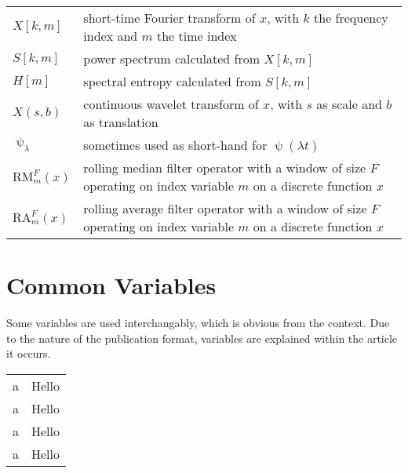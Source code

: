 \begin{tabular}{p{} p{}}
    $X[k,m]$ & short-time Fourier transform of $x$, with $k$ the frequency index and $m$ the time index \\
    $S[k,m]$ & power spectrum calculated from $X[k, m]$ \\
    $H[m]$ & spectral entropy calculated from $S[k, m]$ \\
    $X(s, b)$ & continuous wavelet transform of $x$, with $s$ as scale and $b$ as translation \\
    $\uppsi_\lambda$ & sometimes used as short-hand for  $\uppsi(\lambda t)$\\
    $\text{RM}^F_m (x)$ & rolling median filter operator with a window of size $F$ operating on index variable $m$ on a discrete function $x$\\
    $\text{RA}^F_m (x)$ & rolling average filter operator with a window of size $F$ operating on index variable $m$ on a discrete function $x$\\
\end{tabular}

\clearpage
\section*{Common Variables}
Some variables are used interchangably, which is obvious from the context. Due to the nature of the publication format, variables are explained within the article it occurs.

\begin{tabular}{p{} p{}}
    a & Hello \\
    a & Hello \\
    a & Hello \\
    a & Hello \\
\end{tabular}

